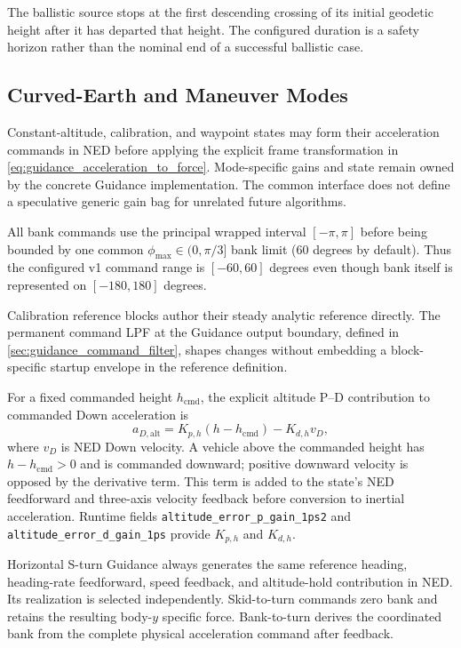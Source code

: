 The ballistic source stops at the first descending crossing of its initial
geodetic height after it has departed that height. The configured duration is
a safety horizon rather than the nominal end of a successful ballistic case.

\subsection{Curved-Earth and Maneuver Modes}

Constant-altitude, calibration, and waypoint states may form their acceleration
commands in NED before applying the explicit frame transformation in
\cref{eq:guidance_acceleration_to_force}. Mode-specific gains and state remain
owned by the concrete Guidance implementation. The common interface does not
define a speculative generic gain bag for unrelated future algorithms.

All bank commands use the principal wrapped interval
$[-\pi,\pi]$ before being bounded by one common
$\phi_{\max}\in(0,\pi/3]$ bank limit (60 degrees by default). Thus the
configured v1 command range is $[-60,60]$ degrees even though bank itself is
represented on $[-180,180]$ degrees.

Calibration reference blocks author their steady analytic reference directly. The
permanent command LPF at the Guidance output boundary, defined in
\cref{sec:guidance_command_filter}, shapes changes without embedding a
block-specific startup envelope in the reference definition.

For a fixed commanded height $h_{\mathrm{cmd}}$, the explicit altitude
P--D contribution to commanded Down acceleration is
\begin{equation}
a_{D,\mathrm{alt}}
=K_{p,h}\left(h-h_{\mathrm{cmd}}\right)-K_{d,h}v_D,
\label{eq:altitude_pd_guidance}
\end{equation}
where $v_D$ is NED Down velocity. A vehicle above the commanded height has
$h-h_{\mathrm{cmd}}>0$ and is commanded downward; positive downward velocity
is opposed by the derivative term. This term is added to the state's NED
feedforward and three-axis velocity feedback before conversion to inertial
acceleration. Runtime fields \texttt{altitude\_error\_p\_gain\_1ps2} and
\texttt{altitude\_error\_d\_gain\_1ps} provide $K_{p,h}$ and $K_{d,h}$.

Horizontal S-turn Guidance always generates the same reference heading,
heading-rate feedforward, speed feedback, and altitude-hold contribution in
NED. Its realization is selected independently. Skid-to-turn commands zero
bank and retains the resulting body-$y$ specific force. Bank-to-turn derives
the coordinated bank from the complete physical acceleration command after
feedback.

